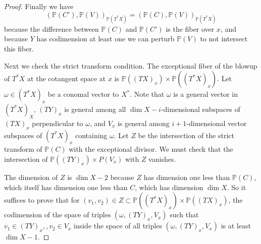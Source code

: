 \documentclass[12pt]{amsart}
\theoremstyle{definition}
\theoremstyle{remark}
\begin{document}
\begin{proof}
Finally we have \[ (\mathbb P(C'), \mathbb P(V))_{\mathbb P(T^* X) } =(\mathbb P(C), \mathbb P(V))_{\mathbb P(T^* X) }\] because the difference between $\mathbb P(C)$ and $\mathbb P(C')$ is the fiber over $x$, and because $Y$ has codimension at least one we can perturb $\mathbb P(V)$ to not intersect this fiber.

Next we check the strict transform condition. The exceptional fiber of the blowup of $ T^* X$ at the cotangent space at $x$ is $\mathbb P ((TX)_x ) \times \mathbb P ( (T^* X)_x)$.  Let $\omega \in (T^*X)_x$ be a conomal vector to $X^*$. Note that $\omega$ is a general vector in $(T^*X)_X$, $(TY)_x$ is general among all $\dim X-i$-dimensional subspaces of $(TX)_x$ perpendicular to $\omega$, and $V_x$ is general among $i+1$-dimensional vector subspaces of $(T^*X)_x$ containing $\omega$. Let $Z$ be the intersection of the strict transform of $\mathbb P(C)$ with the exceptional divisor. We must check that the intersection of $ \mathbb P (  (TY)_x) \times P (V_x)$ with $Z$ vanishes.

The dimension of $Z$ is $\dim X-2$ because $Z$ has dimension one less than $\mathbb P(C)$, which itself has dimension one less than $C$, which has dimension $\dim X$.
So it suffices to prove that for $(v_1,v_2) \in Z \subset \mathbb P ( (T^*X)_x) \times \mathbb P( (TX)_x)$, the codimension of the space of triples $( \omega, (TY)_x, V_x)$ such that $v_1\in (TY)_x , ,v_2 \in V_x $ inside the space of all triples $(\omega, (TY)_x, V_x)$ is at least $\dim X-1$. 





\end{proof}
\end{document}
